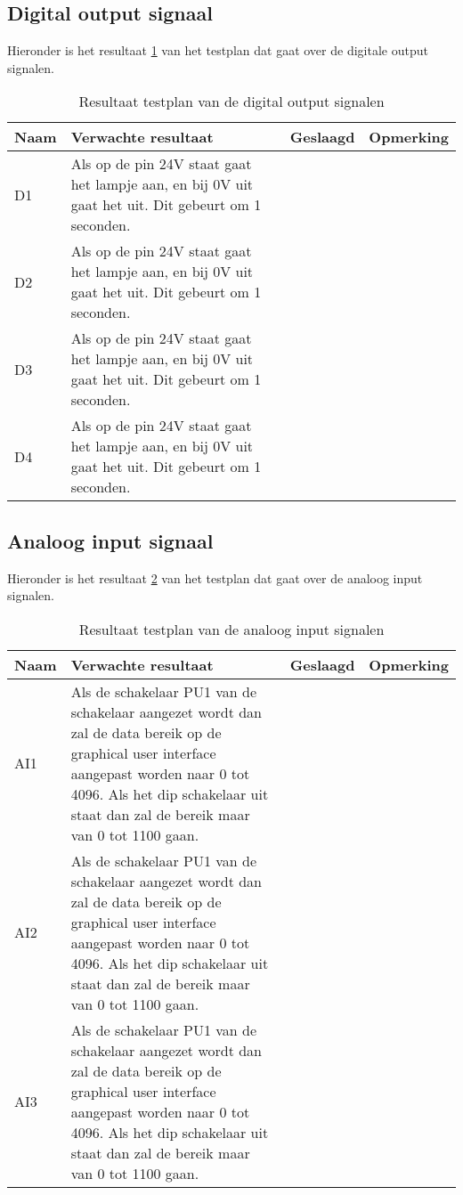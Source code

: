 \subsection{Digital output signaal}
Hieronder is het resultaat \ref{tab:resultaatdio} van het testplan dat gaat over de digitale output signalen.
\begin{table}[h!]
	\centering
	\caption{Resultaat testplan van de digital output signalen}
	\begin{tabular}{lp{8.5cm}lp{4cm}}
	\toprule
	\textbf{Naam} 	& \textbf{Verwachte resultaat} & \textbf{Geslaagd} & \textbf{Opmerking} \\ \toprule
	D1	&	Als op de pin 24V staat gaat het lampje aan, en bij 0V uit gaat het uit. Dit gebeurt om 1 seconden. && \\			
	D2	&	Als op de pin 24V staat gaat het lampje aan, en bij 0V uit gaat het uit. Dit gebeurt om 1 seconden. && \\			
	D3	&	Als op de pin 24V staat gaat het lampje aan, en bij 0V uit gaat het uit. Dit gebeurt om 1 seconden. && \\			
	D4	&	Als op de pin 24V staat gaat het lampje aan, en bij 0V uit gaat het uit. Dit gebeurt om 1 seconden. && \\ \bottomrule
	\end{tabular}
	\label{tab:resultaatdio}
\end{table}

\subsection{Analoog input signaal}
Hieronder is het resultaat \ref{tab:resultaatai} van het testplan dat gaat over de analoog input signalen.
\begin{table}[h!]
	\caption{Resultaat testplan van de analoog input signalen}
	\begin{tabular}{lp{8.5cm}lp{4cm}}
	\toprule
	\textbf{Naam} 	& \textbf{Verwachte resultaat} & \textbf{Geslaagd} & \textbf{Opmerking}\\ \toprule
	AI1			& Als de schakelaar PU1 van de schakelaar aangezet wordt dan zal de data bereik op de graphical user interface aangepast worden naar 0 tot 4096. Als het dip schakelaar uit staat dan zal de bereik maar van 0 tot 1100 gaan.\\
	AI2			& Als de schakelaar PU1 van de schakelaar aangezet wordt dan zal de data bereik op de graphical user interface aangepast worden naar 0 tot 4096. Als het dip schakelaar uit staat dan zal de bereik maar van 0 tot 1100 gaan.\\
	AI3			& Als de schakelaar PU1 van de schakelaar aangezet wordt dan zal de data bereik op de graphical user interface aangepast worden naar 0 tot 4096. Als het dip schakelaar uit staat dan zal de bereik maar van 0 tot 1100 gaan.\\  \bottomrule
	\end{tabular}
	\label{tab:resultaatai}
\end{table}

